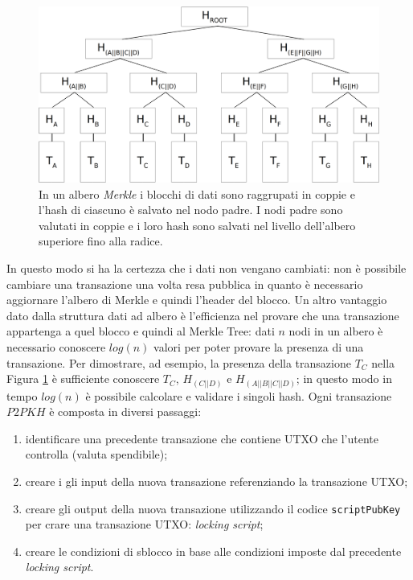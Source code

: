 \begin{figure}
    \centering
    \includegraphics[width=\textwidth]{./images/merkle.png}
    \caption{In un albero \textit{Merkle} i blocchi di dati sono raggrupati in coppie e l'hash di ciascuno è salvato nel nodo padre. I nodi padre sono valutati in coppie e i loro hash sono salvati nel livello dell'albero superiore fino alla radice.}
    \label{fig:merkle}
\end{figure}
In questo modo si ha la certezza che i dati non vengano cambiati: non è possibile cambiare una transazione una volta resa pubblica in quanto è necessario aggiornare l'albero di Merkle e quindi l'header del blocco.
Un altro vantaggio dato dalla struttura dati ad albero è l'efficienza nel provare che una transazione appartenga a quel blocco e quindi al Merkle Tree: dati $n$ nodi in un albero è necessario conoscere $log(n)$ valori per poter provare la presenza di una transazione.\newline
Per dimostrare, ad esempio, la presenza della transazione $T_C$ nella Figura \ref{fig:merkle} è sufficiente conoscere $T_C$, $H_{(C||D)}$ e $H_{(A||B||C||D)}$; in questo modo in tempo  $log(n)$ è possibile calcolare e validare i singoli hash.\newline
Ogni transazione $P2PKH$ è composta in diversi passaggi:
\begin{enumerate}[1.]
    \item identificare una precedente transazione che contiene UTXO che l'utente controlla (valuta spendibile);
    \item creare i gli input della nuova transazione referenziando la transazione UTXO;
    \item creare gli output della nuova transazione utilizzando il codice \texttt{scriptPubKey} per crare una transazione UTXO: \textit{locking script};
    \item creare le condizioni di sblocco in base alle condizioni imposte dal precedente \textit{locking script}.
\end{enumerate}

